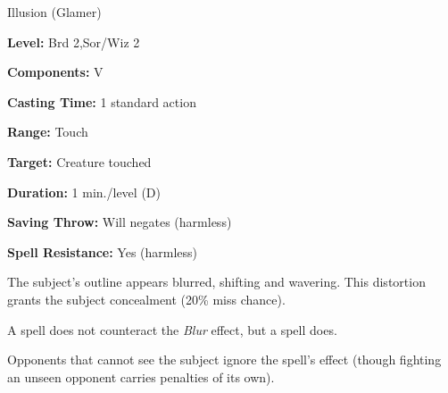 
Illusion (Glamer)

\textbf{Level:} Brd 2,Sor/Wiz 2

\textbf{Components:} V

\textbf{Casting Time:} 1 standard action

\textbf{Range:} Touch

\textbf{Target:} Creature touched

\textbf{Duration:} 1 min./level (D)

\textbf{Saving Throw:} Will negates (harmless)

\textbf{Spell Resistance:} Yes (harmless)

The subject's outline appears blurred, shifting and wavering. This distortion grants 
the subject concealment (20\% miss chance).

A  spell does not counteract the \textit{Blur} effect, 
but a  spell does.

Opponents that cannot see the subject ignore the spell's effect (though fighting 
an unseen opponent carries penalties of its own).

